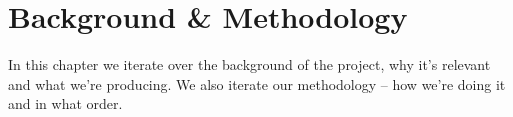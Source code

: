 \section{Background \& Methodology}
In this chapter we iterate over the background of the project, why it's relevant and what we're producing. We also iterate our methodology -- how we're doing it and in what order.


